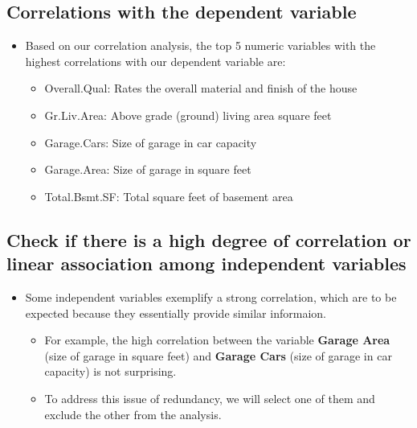 \documentclass[aoas]{imsart}
\providecommand{\tightlist}{%
  \setlength{\itemsep}{0pt}\setlength{\parskip}{0pt}}
\numberwithin{equation}{section}
\theoremstyle{plain}
\theoremstyle{remark}
\begin{document}
\hypertarget{correlations-with-the-dependent-variable}{%
\subsection{Correlations with the dependent
variable}\label{correlations-with-the-dependent-variable}}

\begin{itemize}
\tightlist
\item
  Based on our correlation analysis, the top 5 numeric variables with
  the highest correlations with our dependent variable are:

  \begin{itemize}
  \tightlist
  \item
    Overall.Qual: Rates the overall material and finish of the house
  \item
    Gr.Liv.Area: Above grade (ground) living area square feet
  \item
    Garage.Cars: Size of garage in car capacity
  \item
    Garage.Area: Size of garage in square feet
  \item
    Total.Bsmt.SF: Total square feet of basement area
  \end{itemize}
\end{itemize}

\hypertarget{check-if-there-is-a-high-degree-of-correlation-or-linear-association-among-independent-variables}{%
\subsection{Check if there is a high degree of correlation or linear
association among independent
variables}\label{check-if-there-is-a-high-degree-of-correlation-or-linear-association-among-independent-variables}}

\begin{itemize}
\tightlist
\item
  Some independent variables exemplify a strong correlation, which are
  to be expected because they essentially provide similar informaion.

  \begin{itemize}
  \tightlist
  \item
    For example, the high correlation between the variable
    \textbf{Garage Area} (size of garage in square feet) and
    \textbf{Garage Cars} (size of garage in car capacity) is not
    surprising.
  \item
    To address this issue of redundancy, we will select one of them and
    exclude the other from the analysis.
  \end{itemize}
\end{itemize}
\end{document}
